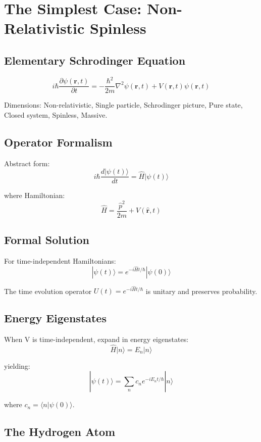 \documentclass[12pt]{article}
\begin{document}
\section{The Simplest Case: Non-Relativistic Spinless}

\subsection{Elementary Schrodinger Equation}

\[
i\hbar\frac{\partial\psi(\mathbf{r},t)}{\partial t} = -\frac{\hbar^2}{2m}\nabla^2\psi(\mathbf{r},t) + V(\mathbf{r},t)\psi(\mathbf{r},t)
\]

Dimensions: Non-relativistic, Single particle, Schrodinger picture, Pure state, Closed system, Spinless, Massive.

\subsection{Operator Formalism}

Abstract form:
\[
i\hbar\frac{d|\psi(t)\rangle}{dt} = \hat{H}|\psi(t)\rangle
\]

where Hamiltonian:
\[
\hat{H} = \frac{\hat{p}^2}{2m} + V(\hat{\mathbf{r}},t)
\]

\subsection{Formal Solution}

For time-independent Hamiltonians:
\[
|\psi(t)\rangle = e^{-i\hat{H}t/\hbar}|\psi(0)\rangle
\]

The time evolution operator $U(t) = e^{-i\hat{H}t/\hbar}$ is unitary and preserves probability.

\subsection{Energy Eigenstates}

When V is time-independent, expand in energy eigenstates:
\[
\hat{H}|n\rangle = E_n|n\rangle
\]

yielding:
\[
|\psi(t)\rangle = \sum_n c_n e^{-iE_nt/\hbar}|n\rangle
\]

where $c_n = \langle n|\psi(0)\rangle$.

\subsection{The Hydrogen Atom}
\end{document}

